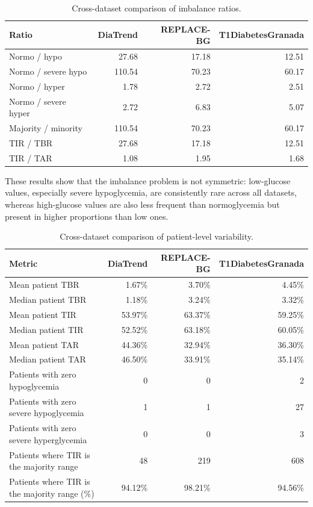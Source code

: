 \begin{table}[htbp]
    \centering
    \caption{Cross-dataset comparison of imbalance ratios.}
    \label{tab:cross_dataset_imbalance_comparison}
    \begin{tabular}{lrrr}
        \hline
        \textbf{Ratio} & \textbf{DiaTrend} & \textbf{REPLACE-BG} & \textbf{T1DiabetesGranada} \\
        \hline
        Normo / hypo & 27.68 & 17.18 & 12.51 \\
        Normo / severe hypo & 110.54 & 70.23 & 60.17 \\
        Normo / hyper & 1.78 & 2.72 & 2.51 \\
        Normo / severe hyper & 2.72 & 6.83 & 5.07 \\
        Majority / minority & 110.54 & 70.23 & 60.17 \\
        \hline
        TIR / TBR & 27.68 & 17.18 & 12.51 \\
        TIR / TAR & 1.08 & 1.95 & 1.68 \\
        \hline
    \end{tabular}
\end{table}

These results show that the imbalance problem is not symmetric: low-glucose values, especially severe hypoglycemia, are consistently rare across all datasets, whereas high-glucose values are also less frequent than normoglycemia but present in higher proportions than low ones.

\begin{table}[htbp]
    \centering
    \caption{Cross-dataset comparison of patient-level variability.}
    \label{tab:cross_dataset_patient_variability}
    \small
    \setlength{\tabcolsep}{4pt}
    \begin{tabularx}{\textwidth}{Xrrr}
        \hline
        \textbf{Metric} &
        \textbf{DiaTrend} &
        \textbf{REPLACE-BG} &
        \textbf{T1DiabetesGranada} \\
        \hline
        Mean patient TBR & 1.67\% & 3.70\% & 4.45\% \\
        Median patient TBR & 1.18\% & 3.24\% & 3.32\% \\
        Mean patient TIR & 53.97\% & 63.37\% & 59.25\% \\
        Median patient TIR & 52.52\% & 63.18\% & 60.05\% \\
        Mean patient TAR & 44.36\% & 32.94\% & 36.30\% \\
        Median patient TAR & 46.50\% & 33.91\% & 35.14\% \\
        \hline
        Patients with zero hypoglycemia & 0 & 0 & 2 \\
        Patients with zero severe hypoglycemia & 1 & 1 & 27 \\
        Patients with zero severe hyperglycemia & 0 & 0 & 3 \\
        \hline
        Patients where TIR is the majority range & 48 & 219 & 608 \\
        Patients where TIR is the majority range (\%) &
        94.12\% & 98.21\% & 94.56\% \\
        \hline
    \end{tabularx}
\end{table}

